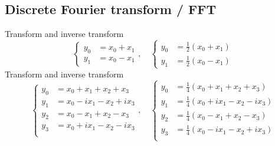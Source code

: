 \documentclass[12pt]{article}
\begin{document}
\subsection*{Discrete Fourier transform / FFT}

Transform and inverse transform
$$
\begin{cases}
y_0&=x_0+x_1\\
y_1&=x_0-x_1
\end{cases},\quad
\begin{cases}
y_0&=\frac{1}{2}(x_0+x_1)\\
y_1&=\frac{1}{2}(x_0-x_1)
\end{cases}
$$
Transform and inverse transform
$$
\begin{cases}
y_0&=x_0+x_1+x_2+x_3\\
y_1&=x_0-ix_1-x_2+ix_3\\
y_2&=x_0-x_1+x_2-x_3\\
y_3&=x_0+ix_1-x_2-ix_3\\
\end{cases},\quad
\begin{cases}
y_0&=\frac{1}{4}(x_0+x_1+x_2+x_3)\\
y_1&=\frac{1}{4}(x_0+ix_1-x_2-ix_3)\\
y_2&=\frac{1}{4}(x_0-x_1+x_2-x_3)\\
y_3&=\frac{1}{4}(x_0-ix_1-x_2+ix_3)\\
\end{cases}
$$

\newpage
\end{document}
